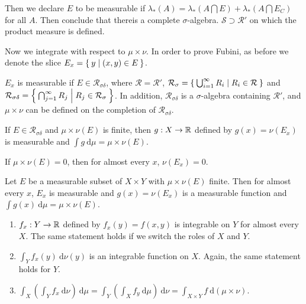 \documentclass[10pt, twoside]{article}
\renewcommand{\d}{\ \mathrm{d}}
\begin{document}
    Then we declare $E$ to be measurable if $\lambda_*(A) = \lambda_*(A \bigcap
    E) + \lambda_*(A \bigcap E_C)$ for all $A$. Then conclude that thereis a
    complete $\sigma$-algebra. $\mathcal{S} \supset \mathcal{R'}$ on which the
    product measure is defined.

    Now we integrate with respect to $\mu \times \nu$. In order to prove
    Fubini, as before we denote the slice $E_x = \Set{y | (x,y) \in E}$.

    \begin{lem} $E_x$ is measurable if $E \in \mathcal{R}_{\sigma\delta}$,
        where $\mathcal{R} = \mathcal{R'}$, $\mathcal{R}_{\sigma} =
        \Set{\bigcup _{i=1}^{\infty} R_i | R_i \in \mathcal{R}}$ and
        $\mathcal{R}_{\sigma\delta} = \Set{\bigcap_{j=1}^{\infty} R_j | R_j \in
        \mathcal{R}_{\sigma}}$. In addition, $\mathcal{R}_{\sigma\delta}$ is a
        $\sigma$-algebra containing $\mathcal{R'}$, and $\mu \times \nu$ can be
        defined on the completion of $\mathcal{R}_{\sigma\delta}$.  \end{lem}

    \begin{lem} If $E \in \mathcal{R}_{\sigma\delta}$ and $\mu \times \nu(E)$
    is finite, then $g:X \rightarrow \mathbb{R}$ defined by $g(x) = \nu(E_x)$ is
measurable and $\int g \d\mu = \mu\times\nu(E)$.  \end{lem}

    \begin{lem} If $\mu \times\nu(E)=0$, then for almost every $x$, $\nu(E_x) =
    0$.  \end{lem}

    \begin{thm} Let $E$ be a measurable subset of $X \times Y$ with $\mu
    \times\nu(E)$ finite. Then for almost every $x$, $E_x$ is measurable and
$g(x) = \nu(E_x)$ is a measurable function and $\int g(x) \d \mu =
\mu\times\nu(E)$.  \end{thm}

    \begin{thm}[Fubini] \begin{enumerate} \item $f_x:Y \rightarrow \mathbb{R}$ defined
        by $f_x(y) = f(x,y)$ is integrable on $Y$ for almost every $X$. The
        same statement holds if we switch the roles of $X$ and $Y$.  \item
        $\int_Y f_x(y) \d\nu(y)$ is an integrable function on $X$. Again, the
        same statement holds for $Y$.  \item $\int_X \left(\int_Y f_x
\d\nu\right)\d\mu = \int_Y \left(\int_X f_y \d\mu\right)\d\nu = \int_{X \times
Y} f \d(\mu\times\nu)$.  \end{enumerate} \end{thm}
\end{document}
